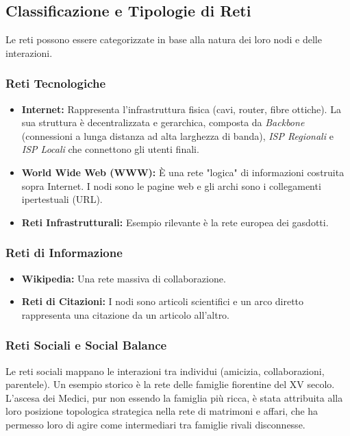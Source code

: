 \subsection{Classificazione e Tipologie di Reti}
Le reti possono essere categorizzate in base alla natura dei loro nodi e delle interazioni.

\subsubsection{Reti Tecnologiche}
\begin{itemize}
    \item \textbf{Internet:} Rappresenta l'infrastruttura fisica (cavi, router, fibre ottiche). La sua struttura è decentralizzata e gerarchica, composta da \textit{Backbone} (connessioni a lunga distanza ad alta larghezza di banda), \textit{ISP Regionali} e \textit{ISP Locali} che connettono gli utenti finali. 
    \item \textbf{World Wide Web (WWW):} È una rete "logica" di informazioni costruita sopra Internet. I nodi sono le pagine web e gli archi sono i collegamenti ipertestuali (URL).
    \item \textbf{Reti Infrastrutturali:} Esempio rilevante è la rete europea dei gasdotti. 
\end{itemize}


\subsubsection{Reti di Informazione}
\begin{itemize}
    \item \textbf{Wikipedia:} Una rete massiva di collaborazione.
    \item \textbf{Reti di Citazioni:} I nodi sono articoli scientifici e un arco diretto rappresenta una citazione da un articolo all'altro.
\end{itemize}

\subsubsection{Reti Sociali e Social Balance}
Le reti sociali mappano le interazioni tra individui (amicizia, collaborazioni, parentele).
Un esempio storico è la rete delle famiglie fiorentine del XV secolo. L'ascesa dei Medici, pur non essendo la famiglia più ricca, è stata attribuita alla loro posizione topologica strategica nella rete di matrimoni e affari, che ha permesso loro di agire come intermediari tra famiglie rivali disconnesse.

